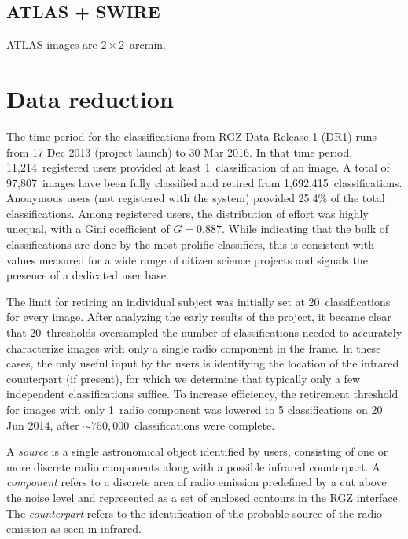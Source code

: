 \documentclass[a4,useAMS,usenatbib]{mn2e}
\begin{document}
\subsection{ATLAS + SWIRE}\label{ssec:sample_atlas}

ATLAS images are $2\times2$~arcmin. 

\section{Data reduction}\label{sec:data_reduction}

The time period for the classifications from RGZ Data Release 1 (DR1) runs from 17 Dec 2013 (project launch) to 30 Mar 2016. In that time period, 11,214~registered users provided at least 1~classification of an image. A total of 97,807~images have been fully classified and retired from 1,692,415~classifications. Anonymous users (not registered with the system) provided 25.4\% of the total classifications. Among registered users, the distribution of effort was highly unequal, with a Gini coefficient of $G=0.887$. While indicating that the bulk of classifications are done by the most prolific classifiers, this is consistent with values measured for a wide range of citizen science projects \citep{cox15} and signals the presence of a dedicated user base. 

The limit for retiring an individual subject was initially set at 20~classifications for every image. After analyzing the early results of the project, it became clear that 20~thresholds oversampled the number of classifications needed to accurately characterize images with only a single radio component in the frame. In these cases, the only useful input by the users is identifying the location of the infrared counterpart (if present), for which we determine that typically only a few independent classifications suffice. To increase efficiency, the retirement threshold for images with only 1~radio component was lowered to 5 classifications on 20 Jun 2014, after $\sim750,000$~classifications were complete. 

A \emph{source} is a single astronomical object identified by users, consisting of one or more discrete radio components along with a possible infrared counterpart. A \emph{component} refers to a discrete area of radio emission predefined by a cut above the noise level and represented as a set of enclosed contours in the RGZ interface. The \emph{counterpart} refers to the identification of the probable source of the radio emission as seen in infrared. 
\end{document}
